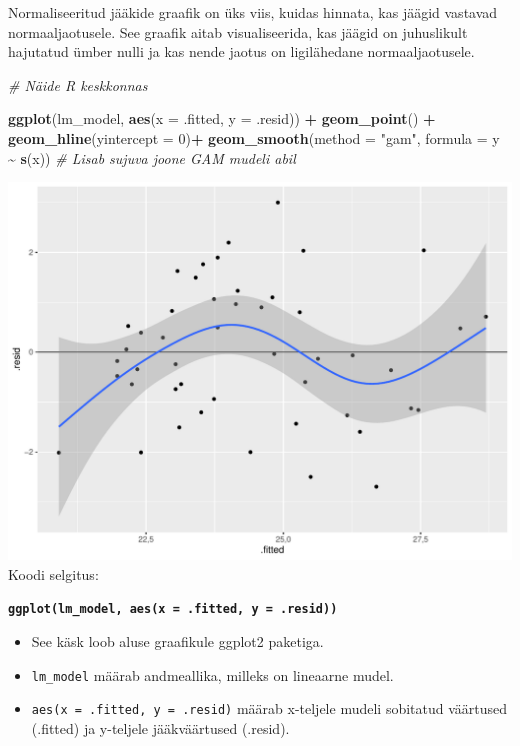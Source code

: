 \documentclass[
]{book}
\newenvironment{Shaded}{\begin{snugshade}}{\end{snugshade}}
\newcommand{\AttributeTok}[1]{\textcolor[rgb]{0.13,0.29,0.53}{#1}}
\newcommand{\CommentTok}[1]{\textcolor[rgb]{0.56,0.35,0.01}{\textit{#1}}}
\newcommand{\DecValTok}[1]{\textcolor[rgb]{0.00,0.00,0.81}{#1}}
\newcommand{\FunctionTok}[1]{\textcolor[rgb]{0.13,0.29,0.53}{\textbf{#1}}}
\newcommand{\NormalTok}[1]{#1}
\newcommand{\SpecialCharTok}[1]{\textcolor[rgb]{0.81,0.36,0.00}{\textbf{#1}}}
\newcommand{\StringTok}[1]{\textcolor[rgb]{0.31,0.60,0.02}{#1}}
\providecommand{\tightlist}{%
  \setlength{\itemsep}{0pt}\setlength{\parskip}{0pt}}
\renewenvironment{Shaded} {\begin{snugshade}\footnotesize} {\end{snugshade}}
\begin{document}
Normaliseeritud jääkide graafik on üks viis, kuidas hinnata, kas jäägid vastavad normaaljaotusele. See graafik aitab visualiseerida, kas jäägid on juhuslikult hajutatud ümber nulli ja kas nende jaotus on ligilähedane normaaljaotusele.

\begin{Shaded}
\begin{Highlighting}[]
\CommentTok{\# Näide R keskkonnas}

\FunctionTok{ggplot}\NormalTok{(lm\_model, }\FunctionTok{aes}\NormalTok{(}\AttributeTok{x =}\NormalTok{ .fitted, }\AttributeTok{y =}\NormalTok{ .resid)) }\SpecialCharTok{+}
  \FunctionTok{geom\_point}\NormalTok{() }\SpecialCharTok{+}
  \FunctionTok{geom\_hline}\NormalTok{(}\AttributeTok{yintercept =} \DecValTok{0}\NormalTok{)}\SpecialCharTok{+}
  \FunctionTok{geom\_smooth}\NormalTok{(}\AttributeTok{method =} \StringTok{"gam"}\NormalTok{, }\AttributeTok{formula =}\NormalTok{ y }\SpecialCharTok{\textasciitilde{}} \FunctionTok{s}\NormalTok{(x))  }\CommentTok{\# Lisab sujuva joone GAM mudeli abil}
\end{Highlighting}
\end{Shaded}

\includegraphics[width=0.8\linewidth]{_main_files/figure-latex/unnamed-chunk-65-1}
Koodi selgitus:

\textbf{\texttt{ggplot(lm\_model,\ aes(x\ =\ .fitted,\ y\ =\ .resid))}}

\begin{itemize}
\tightlist
\item
  See käsk loob aluse graafikule ggplot2 paketiga.
\item
  \texttt{lm\_model} määrab andmeallika, milleks on lineaarne mudel.
\item
  \texttt{aes(x\ =\ .fitted,\ y\ =\ .resid)} määrab x-teljele mudeli sobitatud väärtused (.fitted) ja y-teljele jääkväärtused (.resid).
\end{itemize}
\end{document}

